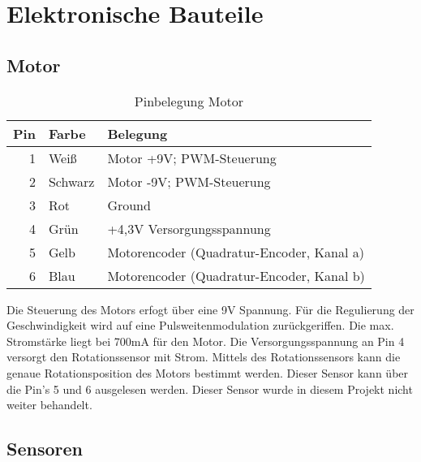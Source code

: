 
\section{Elektronische Bauteile}

\subsection{Motor}\label{eb:motor}

\begin{table}[!ht]
\centering
\rmfamily
\caption{Pinbelegung Motor}
\renewcommand{\arraystretch}{1.1}
\sffamily
\begin{footnotesize}
\begin{tabular}{r | l l}
\toprule
\textbf{Pin} & \textbf{Farbe}  & \textbf{Belegung}\\
\midrule
1 & Weiß & Motor +9V; PWM-Steuerung \\
2 & Schwarz & Motor -9V; PWM-Steuerung \\
3 & Rot & Ground \\
4 & Grün & +4,3V Versorgungsspannung \\
5 & Gelb & Motorencoder (Quadratur-Encoder, Kanal a) \\
6 & Blau & Motorencoder (Quadratur-Encoder, Kanal b) \\
\bottomrule
\end{tabular}
\end{footnotesize}
\label{eb:motor:tbl}
\end{table}

Die Steuerung des Motors erfogt über eine 9V Spannung. Für die Regulierung der Geschwindigkeit wird auf eine Pulsweitenmodulation zurückgeriffen. Die max. Stromstärke liegt bei 700mA für den Motor.  Die Versorgungsspannung an Pin 4 versorgt den Rotationssensor mit Strom. Mittels des Rotationssensors kann die genaue Rotationsposition des Motors bestimmt werden. Dieser Sensor kann über die Pin's 5 und 6 ausgelesen werden. Dieser Sensor wurde in diesem Projekt nicht weiter behandelt.


\subsection{Sensoren}\label{eb:sensor}


